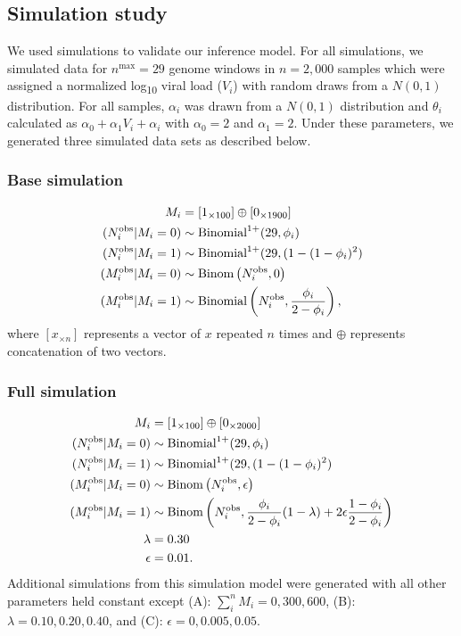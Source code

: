 \documentclass[10pt,letterpaper]{article}
\newcommand{\MI}{M^{\text{\text{obs}}}}
\begin{document}
\subsection{Simulation study}
We used simulations to validate our inference model. For all simulations, we simulated data for ${n^{\text{max}}} = 29$ genome windows in $n = 2,000$ samples which were assigned a normalized log\textsubscript{10} viral load ($V_i$) with random draws from a $N(0,1)$ distribution. For all samples, $\alpha_i$ was drawn from a $N(0,1)$ distribution and $\theta_i$ calculated as $\alpha_0 + \alpha_1 V_i + \alpha_i$ with $\alpha_0 = 2$ and $\alpha_1 = 2$. Under these parameters, we generated three simulated data sets as described below.

\subsubsection{Base simulation}
\label{sec:base_simulation}
\begin{subequations}
\begin{align}
M_i &= [{1}_{\times 100}] \oplus [{0}_{\times 1900}]\\
(N^{\text{obs}}_i | M_i = 0) &\sim \text{Binomial}^{1+}(29, \phi_i) \\
(N^{\text{obs}}_i | M_i = 1) &\sim \text{Binomial}^{1+}(29, (1-(1-\phi_i)^2) \\
(\MI_i | M_i = 0)  &\sim \text{Binom}\left(N^{\text{obs}}_i, 0\right)\\
(\MI_i | M_i = 1) &\sim \text{Binomial}\left( N^{\text{obs}}_i, \frac{\phi_i}{2-\phi_i}\right),
\end{align}
\end{subequations}
where $[{x}_{\times n}]$ represents a vector of $x$ repeated $n$ times and $\oplus$ represents concatenation of two vectors. \par

\subsubsection{Full simulation}
\label{sec:full_simulation}
\begin{subequations}
\begin{align}
M_i &= [{1}_{\times 100}] \oplus [{0}_{\times 2000}]\\
(N^{\text{obs}}_i | M_i = 0) &\sim \text{Binomial}^{1+}(29, \phi_i) \\
(N^{\text{obs}}_i | M_i = 1) &\sim \text{Binomial}^{1+}(29, (1-(1-\phi_i)^2) \\
(\MI_i | M_i = 0)  &\sim \text{Binom}\left(N^{\text{obs}}_i, \epsilon\right)\\
(\MI_i | M_i = 1) &\sim \text{Binom}\left(N^{\text{obs}}_i, \frac{\phi_i}{2-\phi_i}(1-\lambda) + 2\epsilon\frac{1-\phi_i}{2-\phi_i}\right) \\
\lambda &= 0.30 \\
\epsilon &= 0.01.
\end{align}
\end{subequations}
Additional simulations from this simulation model were generated with all other parameters held constant except (A): $\sum_i^n M_i = 0, 300, 600$, (B): $\lambda = 0.10, 0.20, 0.40$, and (C): $\epsilon = 0, 0.005, 0.05$.
\end{document}
